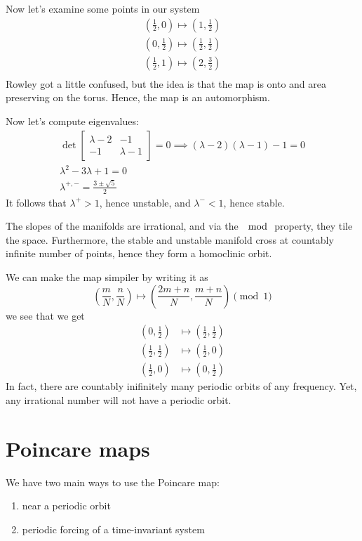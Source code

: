 \documentclass{article}
\begin{document}
Now let's examine some points in our system 
\begin{gather*}
    \left(\frac{1}{2},0\right)\mapsto \left(1,\frac{1}{2}\right)\\
    \left(0,\frac{1}{2}\right)\mapsto \left(\frac{1}{2},\frac{1}{2}\right)\\
    \left(\frac{1}{2},1\right)\mapsto \left(2,\frac{3}{2}\right)\\
\end{gather*}
Rowley got a little confused, but the idea is that the map is onto and area preserving on the torus. Hence, the map is an automorphism.

Now let's compute eigenvalues:
\begin{gather*}
    \det \begin{bmatrix}
        \lambda-2 & -1 \\ -1 & \lambda - 1
    \end{bmatrix}=0\implies (\lambda-2)(\lambda-1)-1=0\\
    \lambda^2-3\lambda +1=0\\
    \lambda^{+,-}=\frac{3\pm\sqrt{5}}{2}
\end{gather*}
It follows that $\lambda^+>1$, hence unstable, and $\lambda^-<1$, hence stable.

The slopes of the manifolds are irrational, and via the $\mod$ property, they tile the space. Furthermore, the stable and unstable manifold cross at countably infinite number of points, hence they form a homoclinic orbit.

We can make the map simpiler by writing it as 
\[
\left(\frac{m}{N},\frac{n}{N}\right)\mapsto\left(\frac{2m+n}{N},\frac{m+n}{N}\right)\pmod 1
\]
we see that we get 
\begin{align*}
    \left(0,\frac{1}{2}\right)&\mapsto \left(\frac{1}{2},\frac{1}{2}\right)\\
    \left(\frac{1}{2},\frac{1}{2}\right)&\mapsto\left(\frac{1}{2},0\right)\\
    \left(\frac{1}{2},0\right)&\mapsto\left(0,\frac{1}{2}\right)
\end{align*}
In fact, there are countably inifinitely many periodic orbits of any frequency. Yet, any irrational number will not have a periodic orbit.

\section{Poincare maps}
We have two main ways to use the Poincare map:
\begin{enumerate}
    \item near a periodic orbit 
    \item periodic forcing of a time-invariant system
\end{enumerate}
\end{document}
